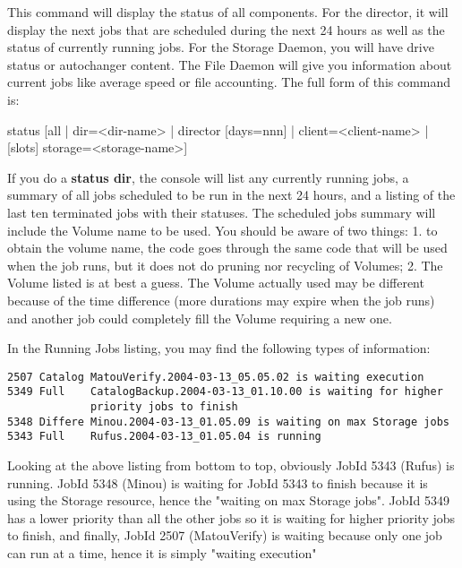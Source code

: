 \begin{description}
{\item [status]

   This command will display the status of all components. For the director, it
   will display the next jobs that are scheduled during the next 24 hours as
   well as the status of currently running jobs. For the Storage Daemon, you
   will have drive status or autochanger content. The File Daemon will give you
   information about current jobs like average speed or file accounting. The
   full form of this command is:

status [all | dir={\textless}dir-name{\textgreater} | director [days=nnn] |
  client={\textless}client-name{\textgreater} | [slots] storage={\textless}storage-name{\textgreater}]

   If you do a {\bf status dir}, the console will list any currently
   running jobs, a summary of all jobs scheduled to be run in the next 24
   hours, and a listing of the last ten terminated jobs with their statuses.
   The scheduled jobs summary will include the Volume name to be used.  You
   should be aware of two things: 1. to obtain the volume name, the code
   goes through the same code that will be used when the job runs, but it
   does not do pruning nor recycling of Volumes; 2.  The Volume listed is
   at best a guess.  The Volume actually used may be different because of
   the time difference (more durations may expire when the job runs) and
   another job could completely fill the Volume requiring a new one.

   In the Running Jobs listing, you may find the following types of
   information:


\footnotesize
\begin{verbatim}
2507 Catalog MatouVerify.2004-03-13_05.05.02 is waiting execution
5349 Full    CatalogBackup.2004-03-13_01.10.00 is waiting for higher
             priority jobs to finish
5348 Differe Minou.2004-03-13_01.05.09 is waiting on max Storage jobs
5343 Full    Rufus.2004-03-13_01.05.04 is running
\end{verbatim}
\normalsize

   Looking at the above listing from bottom to top, obviously JobId 5343
   (Rufus) is running.  JobId 5348 (Minou) is waiting for JobId 5343 to
   finish because it is using the Storage resource, hence the "waiting on
   max Storage jobs".  JobId 5349 has a lower priority than all the other
   jobs so it is waiting for higher priority jobs to finish, and finally,
   JobId 2507 (MatouVerify) is waiting because only one job can run at a
   time, hence it is simply "waiting execution"

}
\end{description}
